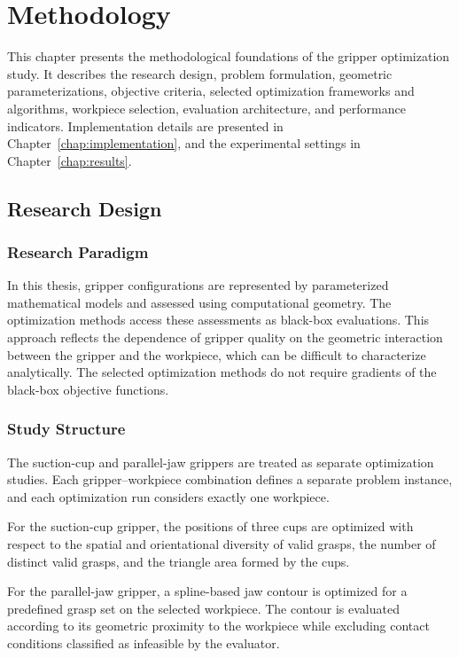 \chapter{Methodology}
\label{chap:methodology}

This chapter presents the methodological foundations of the gripper optimization study. It describes the research design, problem formulation,
geometric parameterizations, objective criteria, selected optimization frameworks and algorithms, workpiece selection, evaluation architecture, and
performance indicators. Implementation details are presented in Chapter~\ref{chap:implementation}, and the
experimental settings in Chapter~\ref{chap:results}.

\section{Research Design}
\label{sec:research_design}

\subsection{Research Paradigm}
\label{subsec:research_paradigm}

In this thesis, gripper configurations are represented by parameterized
mathematical models and assessed using computational geometry. The
optimization methods access these assessments as black-box evaluations.
This approach reflects the dependence of gripper quality on the geometric
interaction between the gripper and the workpiece, which can be difficult
to characterize analytically. The selected optimization methods do not require gradients of the
black-box objective functions.
\subsection{Study Structure}
\label{subsec:study_structure}

The suction-cup and parallel-jaw grippers are treated as separate
optimization studies. Each gripper--workpiece combination defines a
separate problem instance, and each optimization run considers exactly
one workpiece.

For the suction-cup gripper, the positions of three cups are optimized
with respect to the spatial and orientational diversity of valid grasps,
the number of distinct valid grasps, and the triangle area formed by the
cups.

For the parallel-jaw gripper, a spline-based jaw contour is optimized
for a predefined grasp set on the selected workpiece. The contour is
evaluated according to its geometric proximity to the workpiece while
excluding contact conditions classified as infeasible by the evaluator.

